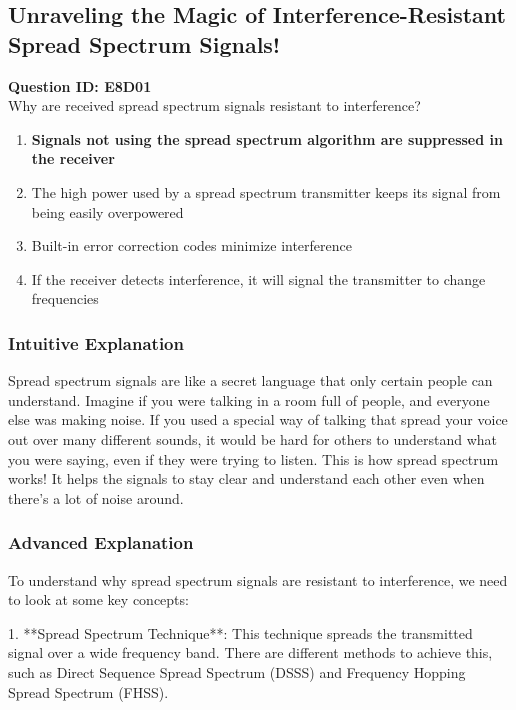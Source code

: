 \subsection{Unraveling the Magic of Interference-Resistant Spread Spectrum Signals!}

\begin{tcolorbox}[colback=blue!5!white, colframe=blue!75!black, title={Question E8D01}]
    \textbf{Question ID: E8D01} \\
    Why are received spread spectrum signals resistant to interference? 
    \begin{enumerate}[label=\Alph*.]
        \item \textbf{Signals not using the spread spectrum algorithm are suppressed in the receiver}
        \item The high power used by a spread spectrum transmitter keeps its signal from being easily overpowered
        \item Built-in error correction codes minimize interference
        \item If the receiver detects interference, it will signal the transmitter to change frequencies
    \end{enumerate}
\end{tcolorbox}

\subsubsection{Intuitive Explanation}
Spread spectrum signals are like a secret language that only certain people can understand. Imagine if you were talking in a room full of people, and everyone else was making noise. If you used a special way of talking that spread your voice out over many different sounds, it would be hard for others to understand what you were saying, even if they were trying to listen. This is how spread spectrum works! It helps the signals to stay clear and understand each other even when there’s a lot of noise around.

\subsubsection{Advanced Explanation}
To understand why spread spectrum signals are resistant to interference, we need to look at some key concepts: 

1. **Spread Spectrum Technique**: This technique spreads the transmitted signal over a wide frequency band. There are different methods to achieve this, such as Direct Sequence Spread Spectrum (DSSS) and Frequency Hopping Spread Spectrum (FHSS).


